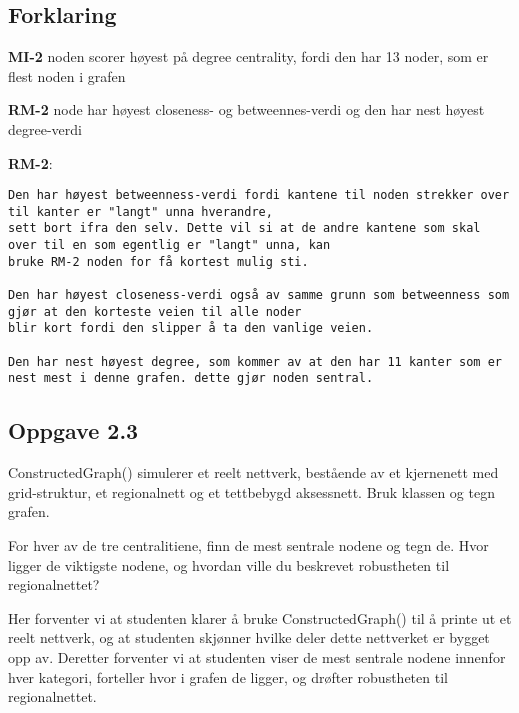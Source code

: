 \documentclass[11pt]{article}
\begin{document}
    \hypertarget{forklaring}{%
\subsection*{Forklaring}\label{forklaring}}

\textbf{MI-2} noden scorer høyest på degree centrality, fordi den har 13
noder, som er flest noden i grafen

\textbf{RM-2} node har høyest closeness- og betweennes-verdi og den har
nest høyest degree-verdi

\textbf{RM-2}:

\begin{verbatim}
Den har høyest betweenness-verdi fordi kantene til noden strekker over til kanter er "langt" unna hverandre,
sett bort ifra den selv. Dette vil si at de andre kantene som skal over til en som egentlig er "langt" unna, kan
bruke RM-2 noden for få kortest mulig sti.

Den har høyest closeness-verdi også av samme grunn som betweenness som gjør at den korteste veien til alle noder
blir kort fordi den slipper å ta den vanlige veien.

Den har nest høyest degree, som kommer av at den har 11 kanter som er nest mest i denne grafen. dette gjør noden sentral.
\end{verbatim}

    \hypertarget{oppgave-2.3}{%
\subsection*{Oppgave 2.3}\label{oppgave-2.3}}

ConstructedGraph() simulerer et reelt nettverk, bestående av et
kjernenett med grid-struktur, et regionalnett og et tettbebygd
aksessnett. Bruk klassen og tegn grafen.

For hver av de tre centralitiene, finn de mest sentrale nodene og tegn
de. Hvor ligger de viktigste nodene, og hvordan ville du beskrevet
robustheten til regionalnettet?

Her forventer vi at studenten klarer å bruke ConstructedGraph() til å
printe ut et reelt nettverk, og at studenten skjønner hvilke deler dette
nettverket er bygget opp av. Deretter forventer vi at studenten viser de
mest sentrale nodene innenfor hver kategori, forteller hvor i grafen de
ligger, og drøfter robustheten til regionalnettet.
\end{document}
